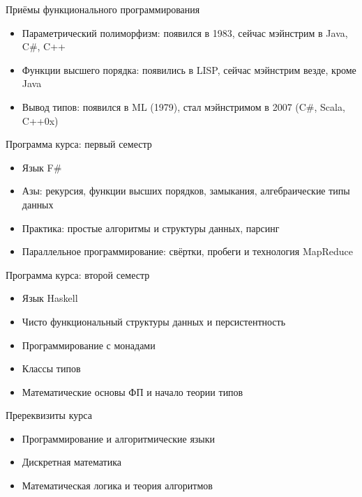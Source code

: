 \documentclass{beamer}
\begin{document}
\begin{frame}{Приёмы функционального программирования}
  \begin{itemize}
  \item Параметрический полиморфизм: появился в 1983, сейчас мэйнстрим в
    Java, C\#, C++\pause
  \item Функции высшего порядка: появились в LISP, сейчас мэйнстрим везде,
    кроме Java\pause
  \item Вывод типов: появился в ML (1979), стал мэйнстримом в 2007
    (C\#, Scala, C++0x)
  \end{itemize}
\end{frame}

\begin{frame}{Программа курса: первый семестр}
  \begin{itemize}
    \item Язык F\#\pause
    \item Азы: рекурсия, функции высших порядков, замыкания, алгебраические
      типы данных\pause
    \item Практика: простые алгоритмы и структуры данных, парсинг\pause
    \item Параллельное программирование: свёртки, пробеги и технология MapReduce
  \end{itemize}
\end{frame}

\begin{frame}{Программа курса: второй семестр}
  \begin{itemize}
    \item Язык Haskell\pause
    \item Чисто функциональный структуры данных и персистентность\pause
    \item Программирование с монадами\pause
    \item Классы типов\pause
    \item Математические основы ФП и начало теории типов
  \end{itemize}
\end{frame}

\begin{frame}{Пререквизиты курса}
  \begin{itemize}
  \item Программирование и алгоритмические языки
  \item Дискретная математика
  \item Математическая логика и теория алгоритмов
  \end{itemize}
\end{frame}
\end{document}
